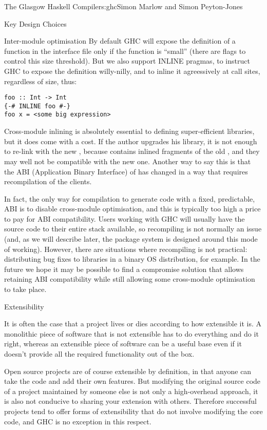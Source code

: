 \begin{aosachapter}{The Glasgow Haskell Compiler}{s:ghc}{Simon Marlow and Simon Peyton-Jones}
\begin{aosasect1}{Key Design Choices}
\begin{aosasect2}{Inter-module optimisation}
By default GHC will expose the definition of a function in the
interface file only if the function is ``small'' (there are flags to
control this size threshold).  But we also support INLINE pragmas, to
instruct GHC to expose the definition willy-nilly, and to inline it
agreessively at call sites, regardless of size, thus:

\begin{verbatim}
foo :: Int -> Int 
{-# INLINE foo #-}
foo x = <some big expression>
\end{verbatim}

Cross-module inlining is absolutely essential to defining
super-efficient libraries, but it does come with a cost.  If the
author upgrades his library, it is not enough to re-link
 with the new , because 
contains inlined fragments of the old , and they may well
not be compatible with the new one.  Another way to say this is that
the ABI (Application Binary Interface) of  has changed in
a way that requires recompilation of the clients.

In fact, the only way for compilation to generate code with a fixed,
predictable, ABI is to disable cross-module optimisation, and this is
typically too high a price to pay for ABI compatibility.  Users
working with GHC will usually have the source code to their entire
stack available, so recompiling is not normally an issue (and, as we
will describe later, the package system is designed around this mode
of working).  However, there are situations where recompiling is not
practical: distributing bug fixes to libraries in a binary OS
distribution, for example.  In the future we hope it may be possible
to find a compromise solution that allows retaining ABI compatibility
while still allowing some cross-module optimisation to take place.

\end{aosasect2}

\end{aosasect1}

\begin{aosasect1}{Extensibility}

It is often the case that a project lives or dies according to how
extensible it is.  A monolithic piece of software that is not
extensible has to do everything and do it right, whereas an extensible
piece of software can be a useful base even if it doesn't provide all
the required functionality out of the box.

Open source projects are of course extensible by definition, in that
anyone can take the code and add their own features.  But modifying
the original source code of a project maintained by someone else is
not only a high-overhead approach, it is also not conducive to sharing
your extension with others.  Therefore successful projects tend to
offer forms of extensibility that do not involve modifying the core
code, and GHC is no exception in this respect.


\end{aosasect1}
\end{aosachapter}
